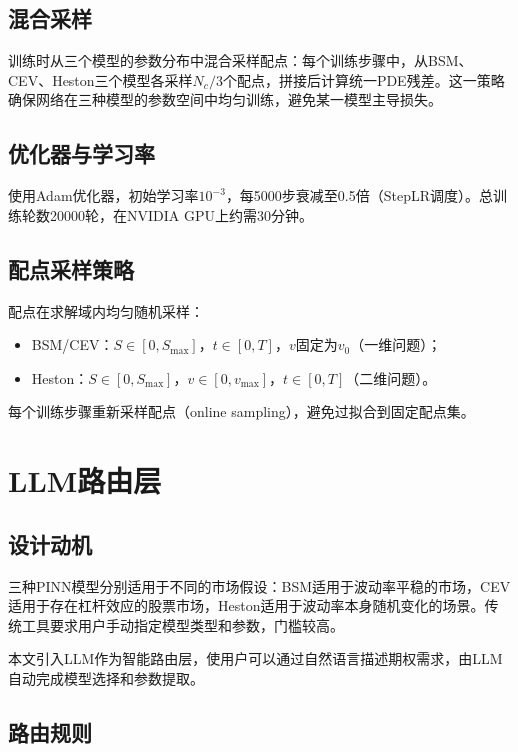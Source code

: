 \subsection{混合采样}

训练时从三个模型的参数分布中混合采样配点：每个训练步骤中，从BSM、CEV、Heston三个模型各采样$N_c/3$个配点，拼接后计算统一PDE残差。这一策略确保网络在三种模型的参数空间中均匀训练，避免某一模型主导损失。

\subsection{优化器与学习率}

使用Adam优化器\cite{kingma2014adam}，初始学习率$10^{-3}$，每5000步衰减至0.5倍（StepLR调度）。总训练轮数20000轮，在NVIDIA GPU上约需30分钟。

\subsection{配点采样策略}

配点在求解域内均匀随机采样：
\begin{itemize}
  \item BSM/CEV：$S\in[0, S_\text{max}]$，$t\in[0,T]$，$v$固定为$v_0$（一维问题）；
  \item Heston：$S\in[0, S_\text{max}]$，$v\in[0, v_\text{max}]$，$t\in[0,T]$（二维问题）。
\end{itemize}
每个训练步骤重新采样配点（online sampling），避免过拟合到固定配点集。

\section{LLM路由层}\label{sec:llm_router}

\subsection{设计动机}

三种PINN模型分别适用于不同的市场假设：BSM适用于波动率平稳的市场，CEV适用于存在杠杆效应的股票市场，Heston适用于波动率本身随机变化的场景。传统工具要求用户手动指定模型类型和参数，门槛较高。

本文引入LLM作为智能路由层，使用户可以通过自然语言描述期权需求，由LLM自动完成模型选择和参数提取。

\subsection{路由规则}

